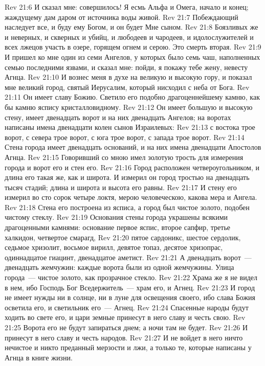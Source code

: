 \vs Rev 21:6 И сказал мне: совершилось! Я есмь Альфа и Омега, начало и конец; жаждущему дам даром от источника воды живой.
\vs Rev 21:7 Побеждающий наследует все, и буду ему Богом, и он будет Мне сыном.
\vs Rev 21:8 Боязливых же и неверных, и скверных и убийц, и любодеев и чародеев, и идолослужителей и всех лжецов участь в озере, горящем огнем и серою. Это смерть вторая.
\rsbpar\vs Rev 21:9 И пришел ко мне один из семи Ангелов, у которых было семь чаш, наполненных семью последними язвами, и сказал мне: пойди, я покажу тебе жену, невесту Агнца.
\vs Rev 21:10 И вознес меня в духе на великую и высокую гору, и показал мне великий город, святый Иерусалим, который нисходил с неба от Бога.
\vs Rev 21:11 Он имеет славу Божию. Светило его подобно драгоценнейшему камню, как бы камню яспису кристалловидному.
\vs Rev 21:12 Он имеет большую и высокую стену, имеет двенадцать ворот и на них двенадцать Ангелов; на воротах написаны имена двенадцати колен сынов Израилевых:
\vs Rev 21:13 с востока трое ворот, с севера трое ворот, с юга трое ворот, с запада трое ворот.
\vs Rev 21:14 Стена города имеет двенадцать оснований, и на них имена двенадцати Апостолов Агнца.
\vs Rev 21:15 Говоривший со мною имел золотую трость для измерения города и ворот его и стен его.
\vs Rev 21:16 Город расположен четвероугольником, и длина его такая же, как и широта. И измерил он город тростью на двенадцать тысяч стадий; длина и широта и высота его равны.
\vs Rev 21:17 И стену его измерил во сто сорок четыре локтя, мерою человеческою, какова мера и Ангела.
\vs Rev 21:18 Стена его построена из ясписа, а город был чистое золото, подобен чистому стеклу.
\vs Rev 21:19 Основания стены города украшены всякими драгоценными камнями: основание первое яспис, второе сапфир, третье халкидон, четвертое смарагд,
\vs Rev 21:20 пятое сардоникс, шестое сердолик, седьмое хризолит, восьмое вирилл, девятое топаз, десятое хризопрас, одиннадцатое гиацинт, двенадцатое аметист.
\vs Rev 21:21 А двенадцать ворот~--- двенадцать жемчужин: каждые ворота были из одной жемчужины. Улица города~--- чистое золото, как прозрачное стекло.
\vs Rev 21:22 Храма же я не видел в нем, ибо Господь Бог Вседержитель~--- храм его, и Агнец.
\vs Rev 21:23 И город не имеет нужды ни в солнце, ни в луне для освещения своего, ибо слава Божия осветила его, и светильник его~--- Агнец.
\vs Rev 21:24 Спасенные народы будут ходить во свете его, и цари земные принесут в него славу и честь свою.
\vs Rev 21:25 Ворота его не будут запираться днем; а ночи там не будет.
\vs Rev 21:26 И принесут в него славу и честь народов.
\vs Rev 21:27 И не войдет в него ничто нечистое и никто преданный мерзости и лжи, а только те, которые написаны у Агнца в книге жизни.
